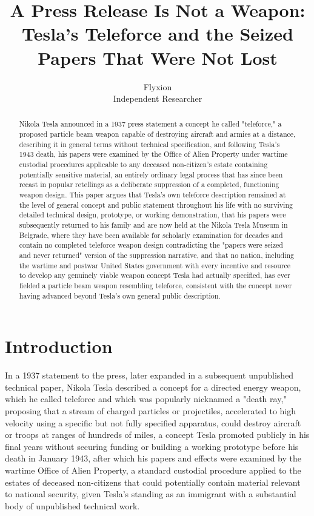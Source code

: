 \documentclass[11pt]{article}
\title{A Press Release Is Not a Weapon: Tesla's Teleforce and the Seized Papers That Were Not Lost}
\author{Flyxion \\ \small Independent Researcher}
\date{}
\begin{document}
\maketitle

\begin{abstract}
Nikola Tesla announced in a 1937 press statement a concept he called "teleforce," a proposed particle beam weapon capable of destroying aircraft and armies at a distance, describing it in general terms without technical specification, and following Tesla's 1943 death, his papers were examined by the Office of Alien Property under wartime custodial procedures applicable to any deceased non-citizen's estate containing potentially sensitive material, an entirely ordinary legal process that has since been recast in popular retellings as a deliberate suppression of a completed, functioning weapon design. This paper argues that Tesla's own teleforce description remained at the level of general concept and public statement throughout his life with no surviving detailed technical design, prototype, or working demonstration, that his papers were subsequently returned to his family and are now held at the Nikola Tesla Museum in Belgrade, where they have been available for scholarly examination for decades and contain no completed teleforce weapon design contradicting the "papers were seized and never returned" version of the suppression narrative, and that no nation, including the wartime and postwar United States government with every incentive and resource to develop any genuinely viable weapon concept Tesla had actually specified, has ever fielded a particle beam weapon resembling teleforce, consistent with the concept never having advanced beyond Tesla's own general public description.
\end{abstract}

\section{Introduction}

In a 1937 statement to the press, later expanded in a subsequent unpublished technical paper, Nikola Tesla described a concept for a directed energy weapon, which he called teleforce and which was popularly nicknamed a "death ray," proposing that a stream of charged particles or projectiles, accelerated to high velocity using a specific but not fully specified apparatus, could destroy aircraft or troops at ranges of hundreds of miles, a concept Tesla promoted publicly in his final years without securing funding or building a working prototype before his death in January 1943, after which his papers and effects were examined by the wartime Office of Alien Property, a standard custodial procedure applied to the estates of deceased non-citizens that could potentially contain material relevant to national security, given Tesla's standing as an immigrant with a substantial body of unpublished technical work.
\end{document}
